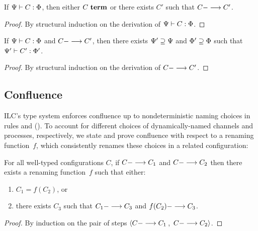 

\begin{theorem}[Progress]
If $\JCty{\StTy}{\ChTy}{C}{\PrTy}$, then either $\JCterm{C}$ or there exists
$C'$ such that $\JCred{C}{C'}$.
\begin{proof}
    By structural induction on the derivation of
    $\JCty{\StTy}{\ChTy}{C}{\PrTy}$.
\end{proof}
\end{theorem}

\begin{theorem}[Preservation]
If $\JCty{\StTy}{\ChTy}{C}{\PrTy}$ and $\JCred{C}{C'}$, then there exists
$\ChTy' \supseteq \ChTy$ and $\PrTy' \supseteq \PrTy$ such that
$\JCty{\StTy'}{\ChTy'}{C'}{\PrTy'}$.
\begin{proof}
  By structural induction on the derivation of $\JCred{C}{C'}$.
\end{proof}
\end{theorem}

\subsection{Confluence}

ILC's type system enforces confluence 
up to nondeterministic naming choices in 
rules  and  ().
%
To account for different choices of dynamically-named channels and processes, respectively, 
we state and prove confluence
with respect to a renaming function~$f$, which consistently renames
these choices in a related configuration:

\begin{theorem}
For all well-typed configurations $C$,
%
 if $\JCred{C}{C_1}$ 
and $\JCred{C}{C_2}$ 
then 
there exists a renaming function~$f$ 
such that either:
\begin{enumerate}
\item %
$C_1 = f(C_2)$,
or
\item there exists $C_3$ such that $\JCred{C_1}{C_3}$ and $\JCred{f(C_2)}{C_3}$.
\end{enumerate}
\begin{proof}
   By induction on the pair of steps 
   $\left< \JCred{C}{C_1}\right.$, 
   $\left.\JCred{C}{C_2} \right>$.
\end{proof}
\end{theorem}

